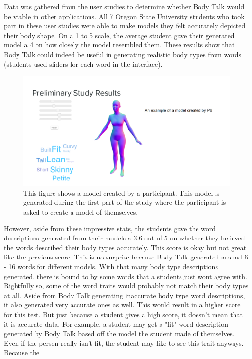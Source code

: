 \documentclass[journal]{vgtc}                %
\begin{document}
\noindent Data was gathered from the user studies to determine whether Body Talk would be viable in other applications. All 7 Oregon State University 
students who took part in these user studies were able to make models they felt accurately depicted their body shape. On a 1 to 5 scale, the average 
student gave their generated model a 4 on how closely the model resembled them. These results show that Body Talk could indeed be useful in generating 
realistic body types from words (students used sliders for each word in the interface). \newline
\begin{figure}[!htb]
	\includegraphics[width=\columnwidth]{user_self_creation.png}
	\caption{This figure shows a model created by a participant. This model is generated during the first part of the study where the participant is asked to create a model of themselves.}
\end{figure}
\noindent However, aside from these impressive stats, the students gave the word descriptions generated from their models a 3.6 out of 5 
on whether  they 
believed the words described their body types accurately. This score is okay but not great like the previous score. This is no surprise 
because Body Talk 
generated around 6 - 16 words for different models. With that many body type descriptions generated, there is bound to by some words 
that a students just 
wont agree with. Rightfully so, some of the word traits would probably not match their body types at all. Aside from Body Talk 
generating inaccurate body 
type word descriptions, it also generated very accurate ones as well. This would result in a higher score for this test. But just 
because a student gives 
a high score, it doesn't mean that it is accurate data. For example, a student may get a "fit" word description generated by Body Talk 
based off the 
model the student made of themselves. Even if the person really isn't fit, the student may like to see this trait anyways. Because the 
\end{document}
